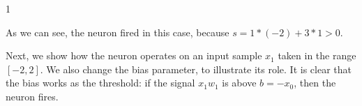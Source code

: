 \documentclass[letterpaper,10pt,english]{jupyterBook}
\begin{document}
\begin{sphinxVerbatim}[commandchars=\\\{\}]
\PYG{p}{[}\PYG{p}{]}\PYG{p}{[}\PYG{p}{]}
\end{sphinxVerbatim}

\begin{sphinxVerbatim}[commandchars=\\\{\}]
1
\end{sphinxVerbatim}

\sphinxAtStartPar
As we can see, the neuron fired in this case, because \(s=1*(-2)+3*1>0\).

\sphinxAtStartPar
Next, we show how the neuron operates on an input sample \(x_1\) taken in the range \([-2,2]\). We also change the bias parameter, to illustrate its role. It is clear that the bias works as the threshold: if the signal \(x_1 w_1\) is above \(b=-x_0\), then the neuron fires.
\end{document}
